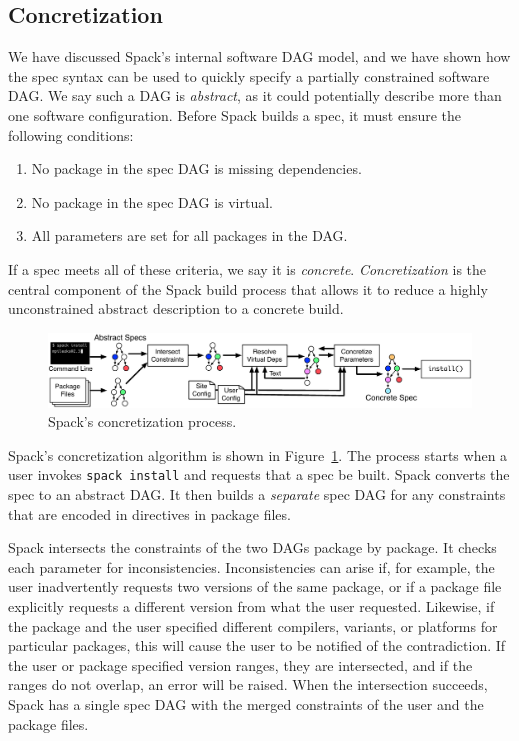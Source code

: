 
\subsection{Concretization}

We have discussed Spack's internal software DAG model, and we have shown
how the spec syntax can be used to quickly specify a partially constrained
software DAG.  We say such a DAG is {\it abstract}, as it could potentially
describe more than one software configuration. Before Spack builds a spec, it
must ensure the following conditions:
\begin{enumerate}
\item No package in the spec DAG is missing dependencies.
\item No package in the spec DAG is virtual.
\item All parameters are set for all packages in the DAG.
\end{enumerate}
If a spec meets all of these criteria, we say it is {\it concrete}.
{\it Concretization} is the central component of the Spack build
process that allows it to reduce a highly unconstrained abstract
description to a concrete build.

\begin{figure}
	\centering
	\includegraphics[width=\textwidth]{figs/concretization.pdf}
	\caption{
		Spack's concretization process.
		\label{fig:concretization}
	}
\end{figure}

Spack's concretization algorithm is shown in Figure~\ref{fig:concretization}.
The process starts when a user invokes {\tt spack install} and requests that a
spec be built.  Spack converts the spec to an abstract DAG.
It then builds a {\it separate} spec DAG for any constraints that are encoded
in directives in package files. 

Spack intersects the constraints of the two DAGs package by package.  It checks
each parameter for inconsistencies.  Inconsistencies can arise if, for example,
the user inadvertently requests two versions of the same package, or if a
package file explicitly requests a different version from what the user requested.
Likewise, if the package and the user specified different compilers, variants,
or platforms for particular packages, this will cause the user to be notified
of the contradiction. If the user or package specified version ranges, they are
intersected, and if the ranges do not overlap, an error will be raised.
When the intersection succeeds, Spack has a single spec DAG with the merged
constraints of the user and the package files.  

